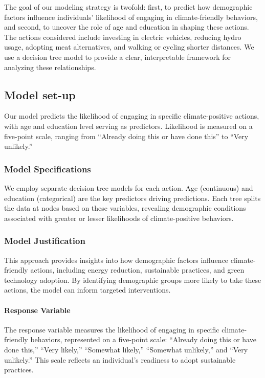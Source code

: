 \documentclass[
  letterpaper,
  DIV=11,
  numbers=noendperiod]{scrartcl}
\let\oldparagraph\paragraph
\renewcommand{\paragraph}[1]{\oldparagraph{#1}\mbox{}}
\begin{document}
The goal of our modeling strategy is twofold: first, to predict how
demographic factors influence individuals' likelihood of engaging in
climate-friendly behaviors, and second, to uncover the role of age and
education in shaping these actions. The actions considered include
investing in electric vehicles, reducing hydro usage, adopting meat
alternatives, and walking or cycling shorter distances. We use a
decision tree model to provide a clear, interpretable framework for
analyzing these relationships.

\subsection{Model set-up}\label{model-set-up}

Our model predicts the likelihood of engaging in specific
climate-positive actions, with age and education level serving as
predictors. Likelihood is measured on a five-point scale, ranging from
``Already doing this or have done this'' to ``Very unlikely.''

\subsubsection{Model Specifications}\label{model-specifications}

We employ separate decision tree models for each action. Age
(continuous) and education (categorical) are the key predictors driving
predictions. Each tree splits the data at nodes based on these
variables, revealing demographic conditions associated with greater or
lesser likelihoods of climate-positive behaviors.

\subsubsection{Model Justification}\label{model-justification}

This approach provides insights into how demographic factors influence
climate-friendly actions, including energy reduction, sustainable
practices, and green technology adoption. By identifying demographic
groups more likely to take these actions, the model can inform targeted
interventions.

\paragraph{Response Variable}\label{response-variable}

The response variable measures the likelihood of engaging in specific
climate-friendly behaviors, represented on a five-point scale: ``Already
doing this or have done this,'' ``Very likely,'' ``Somewhat likely,''
``Somewhat unlikely,'' and ``Very unlikely.'' This scale reflects an
individual's readiness to adopt sustainable practices.
\end{document}
